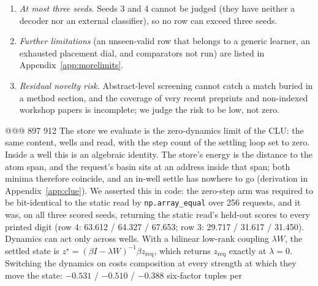 \begin{enumerate}[leftmargin=*,itemsep=1pt]
{  retired.} The store refused the reachable-but-unwritten pair (0.9781) as often as the walled
  one (0.9801), at a false-refusal rate of 0.8182 on grounded-possible requests against a
  pre-registered 0.20. %
  A ridge probe on the same observation at $t=0$ scores AUC 0.48--0.55 across all six seed and
  tier runs: deciding solvability within budget is close to solving the maze, which is a property
  of the task rather than a defect of the model. %
  The Shapes3D coupling hole is a different object in a different environment and is unaffected.
\item \emph{At most three seeds.} Seeds 3 and 4 cannot be judged (they have neither a decoder
  nor an external classifier), so no row can exceed three seeds.
\item \emph{Further limitations} (an unseen-valid row that belongs to a generic learner, an
  exhausted placement dial, and comparators not run) are listed in Appendix~\ref{app:morelimits}.
\item \emph{Residual novelty risk.} Abstract-level screening cannot catch a match buried in a
  method section, and the coverage of very recent preprints and non-indexed workshop papers is
  incomplete; we judge the risk to be low, not zero. %
\end{enumerate}
@@@ 897 912
The store we evaluate is the zero-dynamics limit of the CLU: the same content, wells and read,
with the step count of the settling loop set to zero. Inside a well this is an algebraic
identity. The store's energy is the distance to the atom span, and the request's basin sits at
an address inside that span; both minima therefore coincide, and an in-well settle has nowhere
to go (derivation in Appendix~\ref{app:clue}). We asserted this in code: the zero-step arm was required to be bit-identical to
the static read by \texttt{np.array\_equal} over 256 requests, and it was, on all three scored
seeds, returning the static read's held-out scores to every printed digit (row 4: 63.612 /
64.327 / 67.653; row 3: 29.717 / 31.617 / 31.450). %
Dynamics can act only across wells. With a bilinear low-rank coupling $\lambda W$, the settled
state is $z^\star=(\beta I-\lambda W)^{-1}\beta z_{\text{req}}$, which returns
$z_{\text{req}}$ exactly at $\lambda=0$. Switching the dynamics on costs composition at every
strength at which they move the state: $-0.531$ / $-0.510$ / $-0.388$ six-factor tuples per
